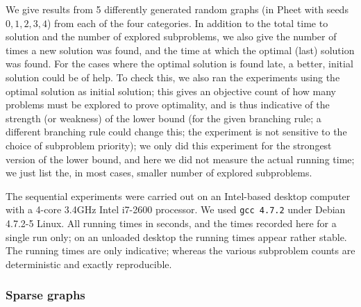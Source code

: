 \documentclass[a4paper,11pt]{article}
\begin{document}
We give results from 5 differently generated random graphs (in Pheet
with seeds $0,1,2,3,4$) from each of the four categories. In addition
to the total time to solution and the number of explored subproblems,
we also give the number of times a new solution was found, and the
time at which the optimal (last) solution was found. For the cases
where the optimal solution is found late, a better, initial solution
could be of help. To check this, we also ran the experiments using the
optimal solution as initial solution; this gives an objective count of
how many problems must be explored to prove optimality, and is thus
indicative of the strength (or weakness) of the lower bound (for the
given branching rule; a different branching rule could change this;
the experiment is not sensitive to the choice of subproblem priority);
we only did this experiment for the strongest version of the lower
bound, and here we did not measure the actual running time; we just
list the, in most cases, smaller number of explored subproblems.

The sequential experiments were carried out on an Intel-based desktop
computer with a 4-core 3.4GHz Intel i7-2600 processor. We used
\texttt{gcc 4.7.2} under Debian 4.7.2-5 Linux.  All running times in
seconds, and the times recorded here for a single run only; on an
unloaded desktop the running times appear rather stable. The running
times are only indicative; whereas the various subproblem counts are
deterministic and exactly reproducible.

\subsubsection{Sparse graphs}
\end{document}
